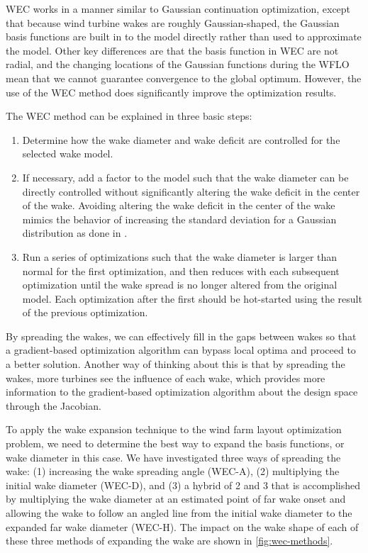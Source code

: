 \documentclass{jpconf}
\begin{document}
WEC works in a manner similar to Gaussian continuation optimization, except that because wind turbine wakes are roughly Gaussian-shaped, the Gaussian basis functions are built in to the model directly rather than used to approximate the model. Other key differences are that the basis function in WEC are not radial, and the changing locations of the Gaussian functions during the WFLO mean that we cannot guarantee convergence to the global optimum. However, the use of the WEC method does significantly improve the optimization results. 

The WEC method can be explained in three basic steps:
\begin{enumerate}[label=\arabic*)]
	\item Determine how the wake diameter and wake deficit are controlled for the selected wake model.
    \item If necessary, add a factor to the model such that the wake diameter can be directly controlled without significantly altering the wake deficit in the center of the wake. Avoiding altering the wake deficit in the center of the wake mimics the behavior of increasing the standard deviation for a Gaussian distribution as done in \cite{mobahi2015}.
    \item Run a series of optimizations such that the wake diameter is larger than normal for the first optimization, and then reduces with each subsequent optimization until the wake spread is no longer altered from the original model. Each optimization after the first should be hot-started using the result of the previous optimization.
\end{enumerate}

By spreading the wakes, we can effectively fill in the gaps between wakes so that a gradient-based optimization algorithm can bypass local optima and proceed to a better solution. Another way of thinking about this is that by spreading the wakes, more turbines see the influence of each wake, which provides more information to the gradient-based optimization algorithm about the design space through the Jacobian. 

To apply the wake expansion technique to the wind farm layout optimization problem, we need to determine the best way to expand the basis functions, or wake diameter in this case. We have investigated three ways of spreading the wake: (1) increasing the wake spreading angle (WEC-A), (2) multiplying the initial wake diameter (WEC-D), and (3) a hybrid of 2 and 3 that is accomplished by multiplying the wake diameter at an estimated point of far wake onset and allowing the wake to follow an angled line from the initial wake diameter to the expanded far wake diameter (WEC-H). The impact on the wake shape of each of these three methods of expanding the wake are shown in \cref{fig:wec-methods}.
\end{document}
